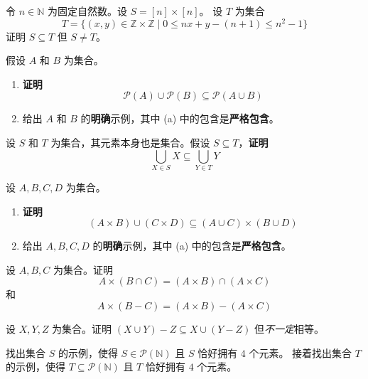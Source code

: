 \clearpage

\begin{exercise}
    令 $n \in \mathbb{N}$ 为固定自然数。设 $S = [n] \times [n]$。 设 $T$ 为集合
    \[T =\Big\{(x, y) \in \mathbb{Z} \times \mathbb{Z} \mid 0 \le nx + y - (n + 1) \le n^2 - 1\Big\}\]
    证明 $S \subseteq T$ 但 $S \ne T$。
\end{exercise}

\begin{exercise}
    假设 $A$ 和 $B$ 为集合。
    \begin{enumerate}[label=(\alph*)]
        \item \textbf{证明} 
        \[\mathcal{P}(A) \cup \mathcal{P}(B) \subseteq \mathcal{P}(A \cup B)\]
        \item 给出 $A$ 和 $B$ 的\textbf{明确}示例，其中 (a) 中的包含是\textbf{严格包含}。
    \end{enumerate}
\end{exercise}

\begin{exercise}
    设 $S$ 和 $T$ 为集合，其元素本身也是集合。假设 $S \subseteq T$，\textbf{证明} 
    \[\bigcup_{X \in S} X \subseteq \bigcup_{Y \in T} Y\]
\end{exercise}

\begin{exercise}
    设 $A, B, C, D$ 为集合。
    \begin{enumerate}[label=(\alph*)]
        \item \textbf{证明} 
        \[(A \times B) \cup (C \times D) \subseteq (A \cup C) \times (B \cup D)\]
        \item 给出 $A,B,C,D$ 的\textbf{明确}示例，其中 (a) 中的包含是\textbf{严格包含}。
    \end{enumerate}
\end{exercise}

\begin{exercise}
    设 $A, B, C$ 为集合。证明
        \[A \times (B \cap C) = (A \times B) \cap (A \times C)\]
    和
        \[A \times (B - C) = (A \times B) - (A \times C)\]
\end{exercise}

\begin{exercise}
    设 $X,Y,Z$ 为集合。证明 $(X \cup Y ) - Z \subseteq X \cup (Y - Z)$ 但\emph{不一定}相等。
\end{exercise}

\begin{exercise}
    找出集合 $S$ 的示例，使得 $S \in \mathcal{P}(\mathbb{N})$ 且 $S$ 恰好拥有 $4$ 个元素。
    接着找出集合 $T$ 的示例，使得 $T \subseteq \mathcal{P}(\mathbb{N})$ 且 $T$ 恰好拥有 $4$ 个元素。
\end{exercise}

